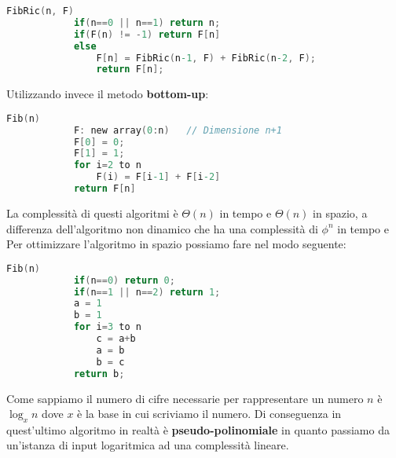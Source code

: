 \begin{example}[Fibonacci]
\begin{lstlisting}[language=C, caption=Fibonacci dinamico top-down, mathescape=true]
	 	FibRic(n, F)
	 		if(n==0 || n==1) return n;
	 		if(F(n) != -1) return F[n]
	 		else
	 			F[n] = FibRic(n-1, F) + FibRic(n-2, F);
	 			return F[n];
	 \end{lstlisting}
 	Utilizzando invece il metodo \textbf{bottom-up}:
 	\begin{lstlisting}[language=C, caption=Fibonacci dinamico bottom-up, mathescape=true]
 		Fib(n)
 			F: new array(0:n)	// Dimensione n+1
 			F[0] = 0;
 			F[1] = 1;
	 		for i=2 to n
	 			F(i) = F[i-1] + F[i-2]
 			return F[n]
 	\end{lstlisting}
 	La complessità di questi algoritmi è $\Theta(n)$ in tempo e $\Theta(n)$ in spazio, a differenza dell'algoritmo non dinamico che ha una complessità di $\phi^n$ in tempo e %
 	Per ottimizzare l'algoritmo in spazio possiamo fare nel modo seguente:
 	\begin{lstlisting}[language=C, caption=Fibonacci spazio costante, mathescape=true]
 		Fib(n)
 			if(n==0) return 0;
 			if(n==1 || n==2) return 1;
 			a = 1
 			b = 1
 			for i=3 to n
 				c = a+b
 				a = b
 				b = c
 			return b;
 	\end{lstlisting}
 	\begin{observation}
 		Come sappiamo il numero di cifre necessarie per rappresentare un numero $n$ è $\log_x n$ dove $x$ è la base in cui scriviamo il numero. Di conseguenza in quest'ultimo algoritmo in realtà è \textbf{pseudo-polinomiale} in quanto passiamo da un'istanza di input logaritmica ad una complessità lineare.
 	\end{observation}
\end{example}

